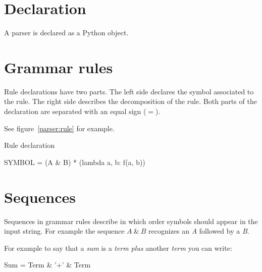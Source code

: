 %
%
%

\section{Declaration}

A parser is declared as a Python object.

\section{Grammar rules}                                         \label{parser:grammar_rules}

Rule declarations have two parts.
The left side declares the symbol associated to the rule.
The right side describes the decomposition of the rule.
Both parts of the declaration are separated with an equal sign (\emph{$=$}).

See figure~\ref{parser:rule} for example.

\begin{code}
\caption{Rule declaration}                                      \label{parser:rule}
\begin{verbatimtab}[4]
    SYMBOL = (A & B) * (lambda a, b: f(a, b))
\end{verbatimtab}
\end{code}

\section{Sequences}                                             \label{parser:sequences}

Sequences in grammar rules describe in which order symbols should appear in the input string.
For example the sequence \emph{$A~\&~B$} recognizes an \emph{A} followed by a \emph{B}.

For example to say that a \emph{sum} is a \emph{term} \emph{plus} another \emph{term} you can write:
\begin{verbatimtab}[4]
    Sum = Term & '+' & Term
\end{verbatimtab}

